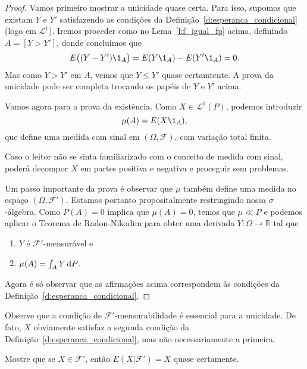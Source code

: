\documentclass[../Notas_de_aula.tex]{subfiles}
\begin{document}
\begin{proof}
  Vamos primeiro mostrar a unicidade quase certa.
  Para isso, supomos que existam $Y$ e $Y'$ satisfazendo as condições da Definição~\ref{d:esperanca_condicional} (logo em $\mathcal{L}^1$).
  Iremos proceder como no Lema~\ref{l:f_igual_fp} acima, definindo $A = [Y > Y']$, donde concluímos que
  \begin{equation}
    E\big( (Y - Y')\1_{A} \big) = E(Y \1_{A}) - E(Y' \1_{A}) = 0.
  \end{equation}
  Mas como $Y > Y'$ em $A$, vemos que $Y \leq Y'$ quase certamtente.
  A prova da unicidade pode ser completa trocando os papéis de $Y$ e $Y'$ acima.

  Vamos agora para a prova da existência.
  Como $X \in \mathcal{L}^1(P)$, podemos introduzir
  \begin{equation}
    \mu(A) = E(X \1_{A}),
  \end{equation}
  que define uma medida com sinal em $(\Omega, \mathcal{F})$, com variação total finita.

  Caso o leitor não se sinta familiarizado com o conceito de medida com sinal, poderá decompor $X$ em partes positiva e negativa e proceguir sem problemas.

  Um passo importante da prova é observar que $\mu$ também define uma medida no espaço $(\Omega, \mathcal{F}')$.
  Estamos portanto propositalmente restringindo nossa $\sigma$-álgebra.
  Como $P(A) = 0$ implica que $\mu(A) = 0$, temos que $\mu \ll P$ e podemos aplicar o Teorema de Radon-Nikodim para obter uma derivada $Y:\Omega \to \mathbb{R}$ tal que
  \begin{enumerate}[\quad a)]
  \item $Y$ é $\mathcal{F}'$-mensurável e
  \item $\mu(A) = \int_A Y \mathop{}\!\mathrm{d} P$.
  \end{enumerate}
  Agora é só observar que as afirmações acima correspondem às condições da Definição~\ref{d:esperanca_condicional}.
\end{proof}

Observe que a condição de $\mathcal{F}'$-mensurabilidade é essencial para a unicidade.
De fato, $X$ obviamente satisfaz a segunda condição da Definição~\ref{d:esperanca_condicional}, mas não necessariamente a primeira.

\begin{exercise}
  Mostre que se $X \in \mathcal{F}'$, então $E(X|\mathcal{F}') = X$ quase certamente.
\end{exercise}
\end{document}
